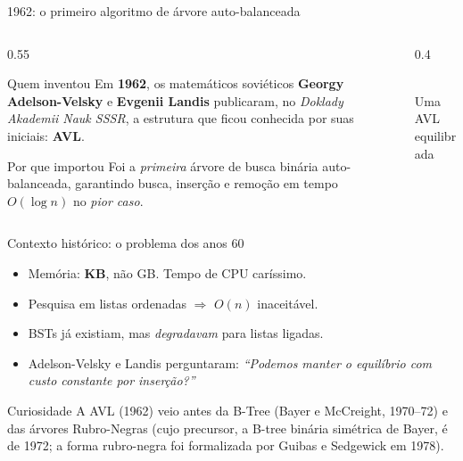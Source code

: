 \documentclass[aspectratio=169]{beamer}
\begin{document}
\begin{frame}{1962: o primeiro algoritmo de árvore auto-balanceada}
  \begin{columns}[T]
    \begin{column}{0.55\textwidth}
      \begin{block}{Quem inventou}
        Em \textbf{1962}, os matemáticos soviéticos
        \textbf{Georgy Adelson-Velsky} e \textbf{Evgenii Landis}
        publicaram, no \emph{Doklady Akademii Nauk SSSR},
        a estrutura que ficou conhecida por suas iniciais:
        \textbf{AVL}.
      \end{block}
      \begin{exampleblock}{Por que importou}
        Foi a \emph{primeira} árvore de busca binária auto-balanceada,
        garantindo busca, inserção e remoção
        em tempo $O(\log n)$ no \emph{pior caso}.
      \end{exampleblock}
    \end{column}
    \begin{column}{0.4\textwidth}
      \begin{center}
      \\[2pt]
      {\scriptsize Uma AVL equilibrada}
      \end{center}
    \end{column}
  \end{columns}
\end{frame}

\begin{frame}{Contexto histórico: o problema dos anos 60}
  \begin{itemize}
    \item Memória: \textbf{KB}, não GB. Tempo de CPU caríssimo.
    \item Pesquisa em listas ordenadas $\Rightarrow$ $O(n)$ inaceitável.
    \item BSTs já existiam, mas \emph{degradavam} para listas ligadas.
    \item Adelson-Velsky e Landis perguntaram:
      \emph{``Podemos manter o equilíbrio com custo constante por inserção?''}
  \end{itemize}
  \vspace{4pt}
  \begin{alertblock}{Curiosidade}
    A AVL (1962) veio antes da B-Tree (Bayer e McCreight, 1970--72)
    e das árvores Rubro-Negras (cujo precursor, a B-tree binária
    simétrica de Bayer, é de 1972; a forma rubro-negra foi
    formalizada por Guibas e Sedgewick em 1978).
  \end{alertblock}
\end{frame}
\end{document}
